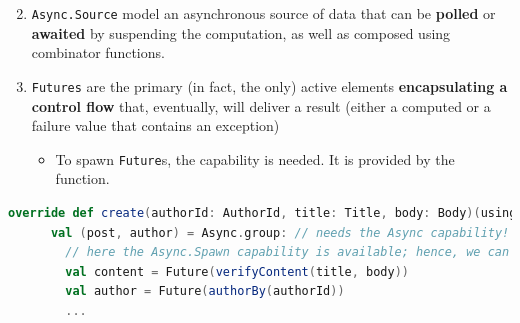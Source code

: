 \documentclass[aspectratio=1610,xcolor=dvipsnames]{beamer}
\begin{document}
\begin{frame}[fragile]
  \begin{block}{}
    \begin{enumerate}
      \setcounter{enumi}{1}
      \item \texttt{Async.Source} model an asynchronous source of data that can be \textbf{polled} or \textbf{awaited} by suspending the computation, as well as composed using combinator functions.
      \item \texttt{Futures} are the primary (in fact, the only) active elements \textbf{encapsulating a control flow} that, eventually, will deliver a result (either a computed or a failure value that contains an exception)
      \begin{itemize}
        \item To spawn \texttt{Future}s, the  capability is needed. It is provided by the  function.
      \end{itemize}
    \end{enumerate}
  \end{block}
  \pause
  \begin{lstlisting}[language=scala,gobble=4]
    override def create(authorId: AuthorId, title: Title, body: Body)(using Async, CanFail): Post =
      val (post, author) = Async.group: // needs the Async capability!
        // here the Async.Spawn capability is available; hence, we can spawn Futures
        val content = Future(verifyContent(title, body))
        val author = Future(authorBy(authorId))
        ...
  \end{lstlisting}
\end{frame}
%
\end{document}
